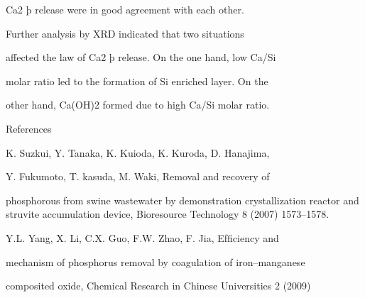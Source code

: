 \documentclass[a4paper,portrait,12pt]{article}
\begin{document}
\begin{flushleft}
Ca2 þ release were in good agreement with each other.
\end{flushleft}


\begin{flushleft}
Further analysis by XRD indicated that two situations
\end{flushleft}


\begin{flushleft}
affected the law of Ca2 þ release. On the one hand, low Ca/Si
\end{flushleft}


\begin{flushleft}
molar ratio led to the formation of Si enriched layer. On the
\end{flushleft}


\begin{flushleft}
other hand, Ca(OH)2 formed due to high Ca/Si molar ratio.
\end{flushleft}


\begin{flushleft}
References
\end{flushleft}


\begin{flushleft}
[1] K. Suzkui, Y. Tanaka, K. Kuioda, K. Kuroda, D. Hanajima,
\end{flushleft}


\begin{flushleft}
Y. Fukumoto, T. kasuda, M. Waki, Removal and recovery of
\end{flushleft}


\begin{flushleft}
phosphorous from swine wastewater by demonstration crystallization reactor and struvite accumulation device, Bioresource Technology 8 (2007) 1573--1578.
\end{flushleft}


\begin{flushleft}
[2] Y.L. Yang, X. Li, C.X. Guo, F.W. Zhao, F. Jia, Efﬁciency and
\end{flushleft}


\begin{flushleft}
mechanism of phosphorus removal by coagulation of iron--manganese
\end{flushleft}


\begin{flushleft}
composited oxide, Chemical Research in Chinese Universities 2 (2009)
\end{flushleft}
\end{document}
